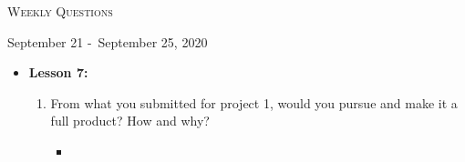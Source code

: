 \centerline{\LARGE\textsc{Weekly Questions}}
\centerline{September 21 -\ September 25, 2020}
\textbf{}
\begin{itemize}
  \item[] \textbf{\large Lesson 7:}
  \begin{enumerate}
    \item From what you submitted for project 1, would you pursue and make it a full product? How and why?
    \begin{itemize}
      \item 
    \end{itemize}
  \end{enumerate} 
\end{itemize}
